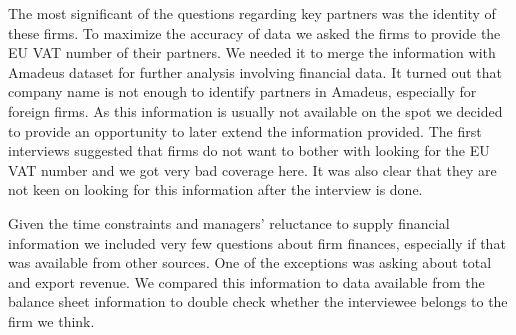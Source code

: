 \documentclass[final, dvipsnames, authoryear,12pt]{elsarticle}
\begin{document}
The most significant of the questions regarding key partners was the identity of these firms. To maximize the accuracy of data we asked the firms to provide the EU VAT number of their partners. We needed it to merge the information with Amadeus dataset for further analysis involving financial data. It turned out that company name is not enough to identify partners in Amadeus, especially for foreign firms. As this information is usually not available on the spot we decided to provide an opportunity to later extend the information provided. The first interviews suggested that firms do not want to bother with looking for the EU VAT number and we got very bad coverage here. It was also clear that they are not keen on looking for this information after the interview is done.





Given the time constraints and managers' reluctance to supply financial information \citep{Bloom2014-hc} we included very few questions about firm finances, especially if that was available from other sources. One of the exceptions was asking about total and export revenue. We compared this information to data available from the balance sheet information to double check whether the interviewee belongs to the firm we think. 

\end{document}
